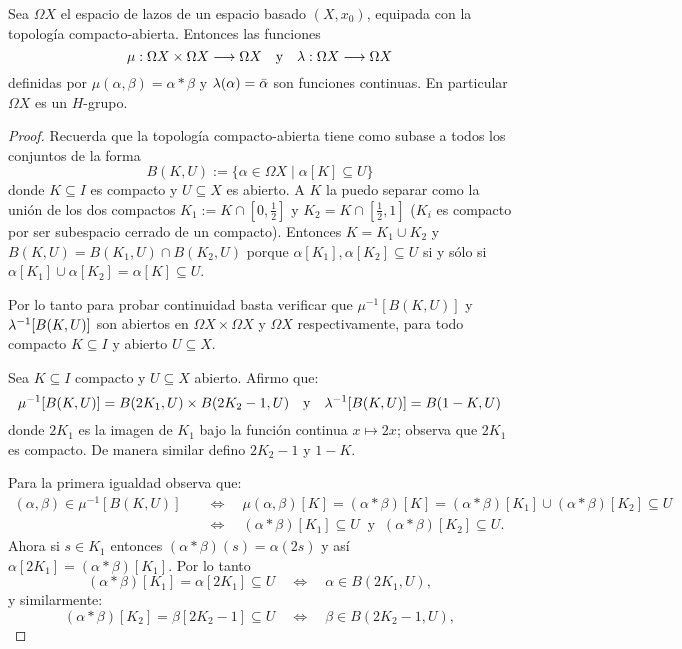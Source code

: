 
\begin{ejercicio}\label{ej:12}
	Sea $\Omega X$ el espacio de lazos de un espacio basado $(X,x_0)$, equipada con la topolog\'ia
	compacto-abierta. Entonces las funciones
	\[
		\mu:\Omega X \times \Omega X \longrightarrow \Omega X \quad\text{y}\quad \lambda:\Omega X \longrightarrow \Omega X
	\]
	definidas por $\mu(\alpha,\beta)=\alpha*\beta$ y $\lambda(\alpha)=\bar{\alpha}$ son funciones
	continuas. En particular $\Omega X$ es un $H$-grupo.
\end{ejercicio}

\begin{proof}%

Recuerda que la topolog\'ia compacto-abierta tiene como subase a todos los conjuntos de la forma
\[
	B(K,U):=\{\alpha\in\Omega X \mid \alpha[K]\subseteq U\}
\]
donde $K\subseteq I$ es compacto y $U\subseteq X$ es abierto. A $K$ la puedo separar como la uni\'on
de los dos compactos $K_1:=K\cap[0,\tfrac{1}{2}]$ y $K_2=K\cap[\tfrac{1}{2},1]$ ($K_i$ es compacto por
ser subespacio cerrado de un compacto). Entonces $K=K_1\cup K_2$ y $B(K,U)=B(K_1,U)\cap B(K_2,U)$ porque
$\alpha[K_1],\alpha[K_2]\subseteq U$ si y s\'olo si $\alpha[K_1]\cup\alpha[K_2]=\alpha[K]\subseteq U$.

Por lo tanto para probar continuidad
basta verificar que $\mu^{-1}[B(K,U)]$ y $\lambda^{-1}[B(K,U)]$ son abiertos en $\Omega X\times\Omega X$
y $\Omega X$ respectivamente, para todo compacto $K\subseteq I$ y abierto $U\subseteq X$.

Sea $K\subseteq I$ compacto y $U\subseteq X$ abierto. Afirmo que:
\[
	\mu^{-1}[B(K,U)]=B(2K_1,U)\times B(2K_2-1,U) \quad\text{y}\quad \lambda^{-1}[B(K,U)]=B(1-K,U)
\]
donde $2K_1$ es la imagen de $K_1$ bajo la funci\'on continua $x\mapsto 2x$; observa que $2K_1$ es
compacto. De manera similar defino $2K_2-1$ y $1-K$.

Para la primera igualdad observa que:
\begin{align*}
	(\alpha,\beta)\in\mu^{-1}[B(K,U)] & \quad\iff\quad
        \mu(\alpha,\beta)[K]=(\alpha*\beta)[K]=(\alpha*\beta)[K_1]\cup(\alpha*\beta)[K_2]\subseteq U\\&
        \quad\iff\quad (\alpha*\beta)[K_1]\subseteq U\;\;\text{y}\;\;(\alpha*\beta)[K_2]\subseteq U.
\end{align*}
Ahora si $s\in K_1$ entonces $(\alpha*\beta)(s)=\alpha(2s)$ y as\'i $\alpha[2K_1]=(\alpha*\beta)[K_1]$.
Por lo tanto
\[
	(\alpha*\beta)[K_1]=
	\alpha[2K_1]\subseteq U \quad\iff\quad
	\alpha\in B(2K_1,U), 
\]
y similarmente:
\[
	(\alpha*\beta)[K_2]=
	\beta[2K_2-1]\subseteq U \quad\iff\quad
	\beta\in B(2K_2-1,U), 
\]


\end{proof}
